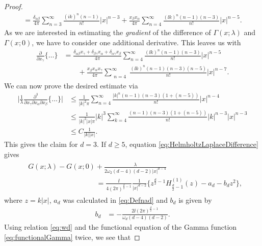 \begin{proof}
\begin{align*}
    = \frac{\delta_{\alpha\beta}}{4 \pi} \sum_{n = 3}^\infty \frac{(ik)^n (n - 1) }{n!} |x|^{n - 3}
    + \frac{x_\beta x_\alpha}{4\pi} \sum_{n = 4}^\infty \frac{(\ii k)^n (n - 1) (n - 3)}{n!} |x|^{n - 5}.
  \end{align*}
  As we are interested in estimating the \emph{gradient} of the difference of $\Gamma(x; \lambda)$ and $\Gamma(x; 0)$, we have to consider one additional derivative. This leaves us with
\begin{align*}
  \frac{\partial}{\partial x_\gamma} \Big\{ \dots \Big\}
    &= \frac{\delta_{\alpha\beta} x_\gamma + \delta_{\beta\gamma} x_\alpha + \delta_{\alpha\gamma} x_\beta}{4\pi} \sum_{n = 4}^\infty \frac{(\ii k)^n (n - 1) (n - 3)}{n!}  |x|^{n - 5} \\
    &\qquad + \frac{x_\beta x_\alpha x_\gamma}{4\pi} \sum_{\substack{n = 4}}^\infty \frac{(\ii k)^n (n - 1) (n - 3) (n - 5)}{n!} |x|^{n - 7}.
\end{align*}
We can now prove the desired estimate via
\begin{align*}
  \bigg| \frac{1}{\lambda} \frac{\partial^3}{\partial x_\gamma \partial x_\alpha \partial x_\beta} \Big\{ \dots \Big\}  \bigg|
  &\leq \frac{1}{|k|^2\pi}  \sum_{n = 4}^\infty \frac{|k|^n (n - 1) (n - 3)(1 + (n - 5))}{n!} |x|^{n - 4} \\
  &\leq \frac{1}{|k|^2 |x|\pi} |k|^3 \sum_{k = 4}^\infty \frac{(n - 1)(n - 3)(1 + (n - 5))}{n!} |k|^{n - 3} |x|^{n - 3}\\
  &\leq C \frac{1}{|k| |x|}.
\end{align*}
This gives the claim for $d = 3$.
If $d \geq 5$, equation \eqref{eq:HelmholtzLaplaceDifference} gives
\begin{align}
  \label{eq:secondTerm}
  \begin{alignedat}{1}
  &G(x; \lambda)- G(x; 0) + \frac{\lambda}{2 \omega_2 (d - 4) (d - 2) |x|^{d - 4}} \\
  &\hspace{4cm}= \frac{\ii}{4 (2\pi)^{\frac{d}{2} - 1}} \frac{1}{|x|^{d - 2}} \Big\{ z^{\frac{d}{2} - 1} H_{\frac{d}{2} - 1}^{(1)}(z) - a_d - b_d z^2\Big\},
  \end{alignedat}
\end{align}
where $z = k|x|$, $a_d$ was calculated in \eqref{eq:Defnad} and $b_d$ is given by
\begin{align*}
 b_d 
 &= -\frac{2\ii (2\pi)^{\frac{d}{2} - 1}}{\omega_d (d - 4) (d - 2)}.
  \end{align*}
    Using relation \eqref{eq:wd} and the functional equation of the Gamma function \eqref{eq:functionalGamma} twice, we see that

\end{proof}
